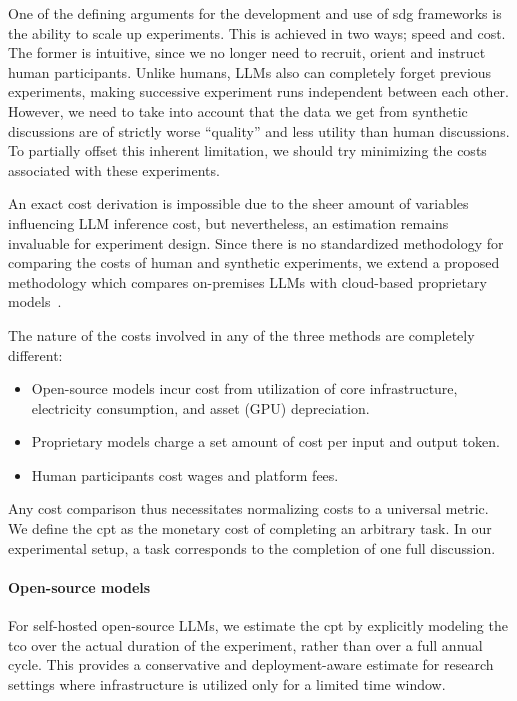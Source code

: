 One of the defining arguments for the development and use of \ac{sdg} frameworks is the ability to scale up experiments. This is achieved in two ways; speed and cost. The former is intuitive, since we no longer need to recruit, orient and instruct human participants. Unlike humans, LLMs also can completely forget previous experiments, making successive experiment runs independent between each other. However, we need to take into account that the data we get from synthetic discussions are of strictly worse ``quality'' and less utility than human discussions. To partially offset this inherent limitation, we should try minimizing the costs associated with these experiments.

An exact cost derivation is impossible due to the sheer amount of variables influencing LLM inference cost, but nevertheless, an estimation remains invaluable for experiment design. Since there is no standardized methodology for comparing the costs of human and synthetic experiments, we extend a proposed methodology which compares on-premises LLMs with cloud-based proprietary models~\cite{pan2025_cost_benefit}.

The nature of the costs involved in any of the three methods are completely different:
\begin{itemize}[nosep,noitemsep]
	\item Open-source models incur cost from utilization of core infrastructure, electricity consumption, and asset (GPU) depreciation. 
	\item Proprietary models charge a set amount of cost per input and output token.
	\item Human participants cost wages and platform fees.
\end{itemize}

Any cost comparison thus necessitates normalizing costs to a universal metric. We define the \acf{cpt} as the monetary cost of completing an arbitrary task. In our experimental setup, a task corresponds to the completion of one full discussion.

\paragraph{Open-source models}
For self-hosted open-source LLMs, we estimate the \acf{cpt} by explicitly modeling the  \ac{tco} over the actual duration of the experiment, rather than over a full annual cycle. This provides a conservative and deployment-aware estimate for research settings where infrastructure is utilized only for a limited time window. 

